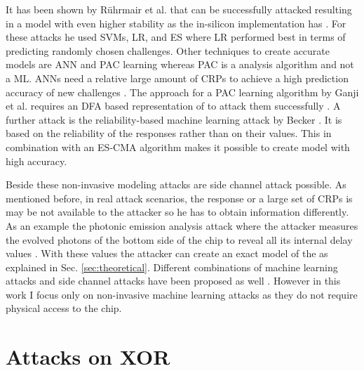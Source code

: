 It has been shown by Rührmair et al. that \apufs can be successfully attacked resulting in a model with even higher stability as the \apuf in-silicon implementation has \cite{Ruhrmair2010ModelingFunctions}.
For these attacks he used \acp{SVM}, \ac{LR}, and \ac{ES} where \ac{LR} performed best in terms of predicting randomly chosen challenges.
Other techniques to create accurate \apuf models are \ac{ANN} and \ac{PAC} learning whereas \ac{PAC} is a analysis algorithm and not a \ac{ML}. 
\acp{ANN} need a relative large amount of \acp{CRP} to achieve a high prediction accuracy of new challenges \cite{Hospodar2012MachineUsability}.
The approach for a \ac{PAC} learning algorithm by Ganji et al. requires an \ac{DFA} based representation of \apufs to attack them successfully \cite{Ganji2016PACPUFs}.
A further attack is the reliability-based machine learning attack by Becker \cite{Becker2015ThePUFs}.
It is based on the reliability of the \puf responses rather than on their values. 
This in combination with an \ac{ES-CMA} algorithm makes it possible to create \apuf model with high accuracy.

Beside these non-invasive modeling attacks are side channel attack possible.
As mentioned before, in real attack scenarios, the \puf response or a large set of \acp{CRP} is may be not available to the attacker so he has to obtain information differently.
As an example the photonic emission analysis attack where the attacker measures the evolved photons of the bottom side of the \apuf chip to reveal all its internal delay values \cite{Tajik2014PhysicalPUFs}.
With these values the attacker can create an exact model of the \apuf as explained in Sec. \ref{sec:theoretical}.
Different combinations of machine learning attacks and side channel attacks have been proposed as well \cite{Mahmoud2013CombinedPUFs, Xu2014Hybrid}.
However in this work I focus only on non-invasive machine learning attacks as they do not require physical access to the \apuf chip.


\section{Attacks on \acs{XOR} \apufs}
\label{sec:attacksonxorarbiter}

